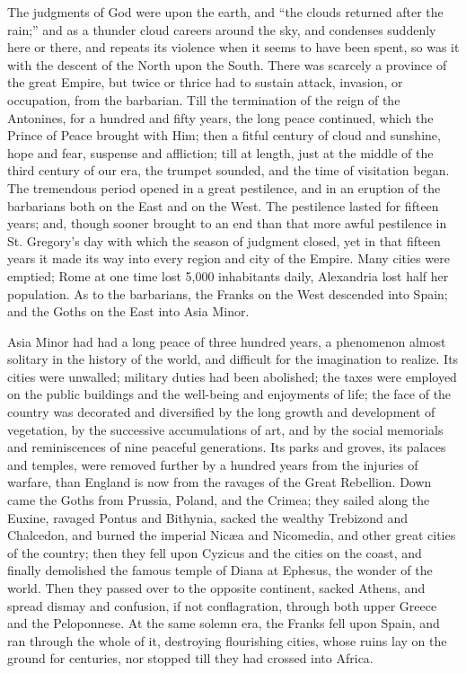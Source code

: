 The judgments of God were upon the earth, and ``the clouds
returned after the rain;'' and as a thunder cloud careers around
the sky, and condenses suddenly here or there, and repeats its
violence when it seems to have been spent, so was it with the descent
of the North upon the South. There was scarcely a province of the
great Empire, but twice or thrice had to sustain attack, invasion, or
occupation, from the barbarian. Till the termination of the reign of
the Antonines, for a hundred and fifty years, the long peace
continued, which the Prince of Peace brought with Him; then a fitful
century of cloud and sunshine, hope and fear, suspense and affliction;
till at length, just at the middle of the third century of our era,
the trumpet sounded, and the time of visitation began. The
tremendous period opened in a great pestilence, and in an eruption of
the barbarians both on the East and on the West. The pestilence lasted
for fifteen years; and, though sooner brought to an end than that more
awful pestilence in St. Gregory's day with which the season of
judgment closed, yet in that fifteen years it made its way into every
region and city of the Empire. Many cities were emptied; Rome at one
time lost 5,000 inhabitants daily, Alexandria lost half her
population. As to the barbarians, the Franks on the West descended
into Spain; and the Goths on the East into Asia Minor.

Asia Minor had had a long peace of three hundred years, a
phenomenon almost solitary in the history of the world, and difficult
for the imagination to realize. Its cities were unwalled; military
duties had been abolished; the taxes were employed on the public
buildings and the well-being and enjoyments of life; the face of the
country was decorated and diversified by the long growth and
development of vegetation, by the successive accumulations of art, and
by the social memorials and reminiscences of nine peaceful
generations. Its parks and groves, its palaces and temples, were
removed further by a hundred years from the injuries of warfare, than
England is now from the ravages of the Great Rebellion. Down came the
Goths from Prussia, Poland, and the Crimea; they sailed along the
Euxine, ravaged Pontus and Bithynia, sacked the wealthy Trebizond and
Chalcedon, and burned the imperial Nicæa and Nicomedia, and other
great cities of the country; then they fell upon Cyzicus and the
cities on the coast, and finally demolished the famous temple of Diana
at Ephesus, the wonder of the world. Then they passed over to the
opposite continent, sacked Athens, and spread dismay and confusion, if
not conflagration, through both upper Greece and the Peloponnese.
At the same solemn era, the Franks fell upon Spain, and ran through
the whole of it, destroying flourishing cities, whose ruins lay on the
ground for centuries, nor stopped till they had crossed into Africa.

